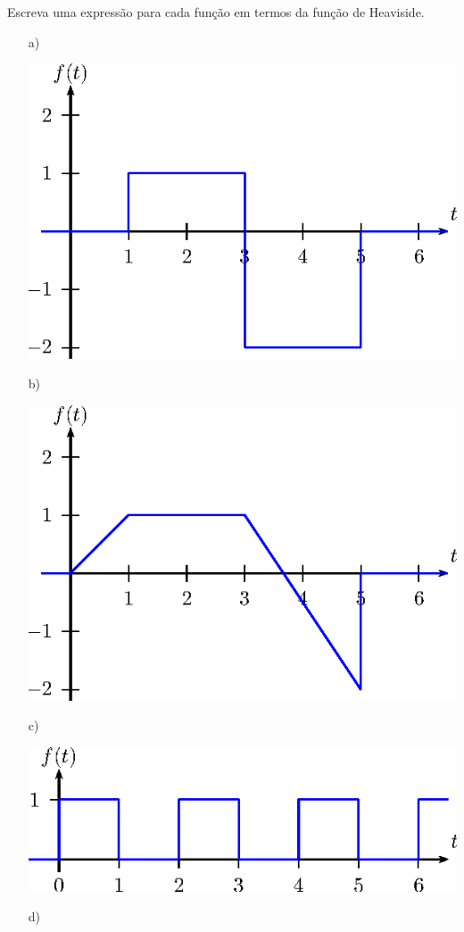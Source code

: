 \begin{exer}{\label{ex_Heaviside1}}Escreva uma expressão para cada função em termos da função de Heaviside.
\begin{itemize}
\item[a)]~
\begin{center}

\includegraphics{cap_trans_int/pics/figura_20}\end{center}
\item[b)]~
\begin{center}

\includegraphics{cap_trans_int/pics/figura_21}\end{center}
\item[c)]~
\begin{center}

\includegraphics{cap_trans_int/pics/figura_22}\end{center}
\item[d)]~
\begin{center}


\end{center}
\end{itemize}
\end{exer}
